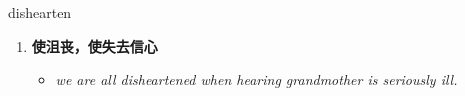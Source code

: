 
\begin{frame}
{\huge dishearten}
\begin{center}
\begin{enumerate}\Large
  \item \textbf{使沮丧，使失去信心}
  \begin{itemize}
    \item \em{\Large{we are all disheartened when hearing grandmother is seriously ill.}}
  \end{itemize}
\end{enumerate}
\end{center}
\end{frame}
